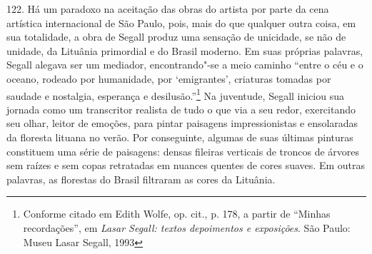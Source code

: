 {{  122.} Há um paradoxo na aceitação das obras do artista por parte da
cena artística internacional de São Paulo, pois, mais do que qualquer
outra coisa, em sua totalidade, a obra de Segall produz uma sensação de
unicidade, se não de unidade, da Lituânia primordial e do Brasil
moderno. Em suas próprias palavras, Segall alegava ser um mediador,
encontrando"-se a meio caminho ``entre o céu e o oceano, rodeado por
humanidade, por `emigrantes', criaturas tomadas por saudade e nostalgia,
esperança e desilusão.''\footnote{Conforme citado em Edith Wolfe, op. cit., p. 178, a partir de
  ``Minhas recordações'', em \textit{Lasar Segall: textos depoimentos e
  exposições}. São Paulo: Museu Lasar Segall, 1993} Na juventude,
Segall iniciou sua jornada como um transcritor realista de tudo o que
via a seu redor, exercitando seu olhar, leitor de emoções, para pintar
paisagens impressionistas e ensolaradas da floresta lituana no verão.
Por conseguinte, algumas de suas últimas pinturas constituem uma série
de paisagens: densas fileiras verticais de troncos de árvores sem raízes
e sem copas retratadas em nuances quentes de cores suaves. Em outras
palavras, as florestas do Brasil filtraram as cores da Lituânia.

}
